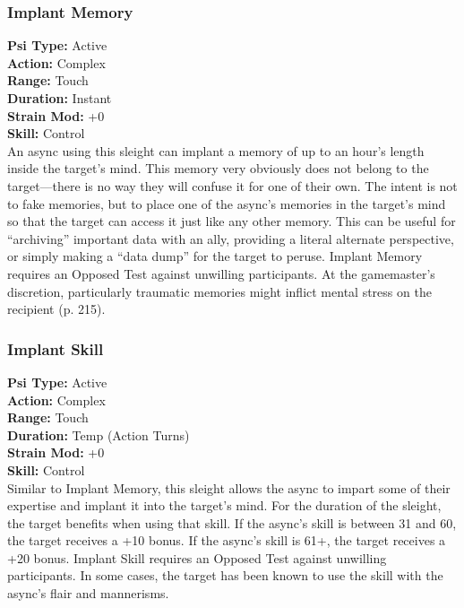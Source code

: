 \subsubsection{Implant Memory}
\textbf{Psi Type:} Active \\ 
\textbf{Action:} Complex \\ 
\textbf{Range:} Touch \\ 
\textbf{Duration:} Instant \\
\textbf{Strain Mod:} +0 \\ 
\textbf{Skill:} Control\\
An async using this sleight can implant a memory
of up to an hour’s length inside the target’s mind.
This memory very obviously does not belong to the
target—there is no way they will confuse it for one
of their own. The intent is not to fake memories, but
to place one of the async’s memories in the target’s
mind so that the target can access it just like any other
memory. This can be useful for “archiving” important
data with an ally, providing a literal alternate perspective,
or simply making a “data dump” for the target
to peruse. Implant Memory requires an Opposed Test
against unwilling participants. At the gamemaster’s
discretion, particularly traumatic memories might
inflict mental stress on the recipient (p. 215).

\subsubsection{Implant Skill}
\textbf{Psi Type:} Active \\ 
\textbf{Action:} Complex \\ 
\textbf{Range:} Touch \\ 
\textbf{Duration:} Temp (Action Turns) \\
\textbf{Strain Mod:} +0 \\ 
\textbf{Skill:} Control\\
Similar to Implant Memory, this sleight allows the
async to impart some of their expertise and implant it
into the target’s mind. For the duration of the sleight,
the target benefits when using that skill. If the async’s
skill is between 31 and 60, the target receives a +10
bonus. If the async’s skill is 61+, the target receives
a +20 bonus. Implant Skill requires an Opposed Test
against unwilling participants. In some cases, the
target has been known to use the skill with the async’s
flair and mannerisms.

